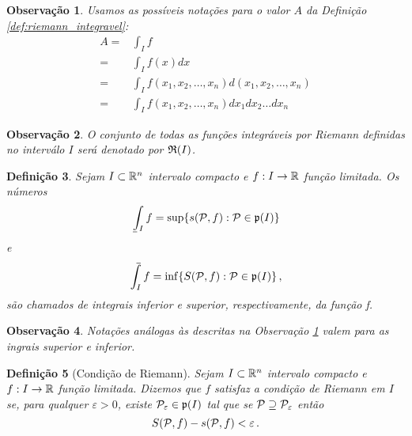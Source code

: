 \documentclass[a4paper,12pt]{extreport}
\newtheorem{mydef}{Definição}
\newtheorem{myobs}[mydef]{Observação}
\newif\ifspacesbetweentheos
\newcommand{\theonewpage}{
\ifspacesbetweentheos
  \newpage
\fi
}
\begin{document}
\begin{myobs}\label{obs:integral_notation}
  Usamos as possíveis notações para o valor $A$ da
  Definição \ref{def:riemann_integravel}:
  \begin{equation}
    \begin{split}
      A =& \int_I f\\
      =& \int_I f(x) dx\\
      =& \int_I f(x_1, x_2, \dots, x_n) d(x_1, x_2, \dots, x_n)\\
      =& \int_I f(x_1, x_2, \dots, x_n) dx_1 dx_2 \dots dx_n
    \end{split}
  \end{equation}
\end{myobs}

\begin{myobs}\label{obs:conj_riemann_int}
  O conjunto de todas as funções integráveis por Riemann
  definidas no interválo $I$ será denotado por
  $\mathfrak{R}(I)$.
\end{myobs}


\theonewpage


\begin{mydef}\label{def:integrais_sup_inf}
  Sejam $I \subset \mathbb{R}^n$ intervalo compacto e
  $f:I \to \mathbb{R}$ função limitada.
  Os números
  \begin{equation}
    \lowint_I f =
    \sup \{ s(\partition,f): \partition \in \allpartition{I} \}
  \end{equation}
  e
  \begin{equation}
    \upint_I f =
    \inf \{ S(\partition,f): \partition \in \allpartition{I} \}\,,
  \end{equation}
  são chamados de \emph{integrais inferior e superior}, respectivamente,
  da função f.
\end{mydef}

\begin{myobs}
  Notações análogas às descritas na
  Observação \ref{obs:integral_notation} valem
  para as ingrais superior e inferior.
\end{myobs}

\begin{mydef}[Condição de Riemann]\label{def:cond_Riemann}
  Sejam $I \subset \mathbb{R}^n$ intervalo compacto e
  $f:I \to \mathbb{R}$ função limitada.
  Dizemos que $f$ satisfaz a \emph{condição de Riemann}
  em $I$ se, para qualquer $\varepsilon > 0$,
  existe $\mathcal{P}_\varepsilon \in \mathfrak{p}(I)$
  tal que se $\mathcal{P} \supseteq \mathcal{P}_\varepsilon$
  então
  \begin{equation}
    S(\mathcal{P},f) - s(\mathcal{P},f) < \varepsilon \,.
  \end{equation}
\end{mydef}
\end{document}
